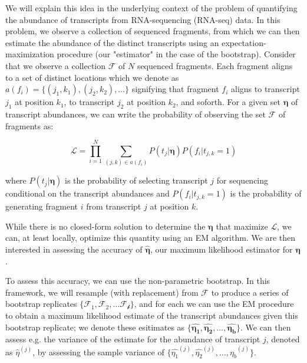 We will explain this idea in the underlying context of the problem of quantifying the abundance 
of transcripts from RNA-sequencing (RNA-seq) data.  In this problem, we observe a collection of 
sequenced fragments, from which we can then estimate the abundance of the distinct transcripts 
using an expectation-maximization procedure (our "estimator" in the case of the bootstrap).  
Consider that we observe a collection $\mathcal{F}$ of $N$ sequenced fragments. Each fragment aligns 
to a set of distinct locations which we denote as $a(f_i) = \{(j_1, k_1), (j_2, k_2), \dots\}$ 
signifying that fragment $f_i$ aligns to transcript $j_1$ at position $k_1$, to transcript $j_2$ 
at position $k_2$, and soforth.  For a given set $\mathbf{\eta}$ of transcript abundances, we can 
write the probability of observing the set $\mathcal{F}$ of fragments as:

$$
\mathcal{L} = \prod_{i=1}^{N} \sum_{(j,k) \in a(f_i)} P(t_j|\mathbf{\eta}) P(f_i|t_{j,k}=1)
$$

where $P(t_j|\mathbf{\eta})$ is the probability of selecting transcript $j$ for sequencing 
conditional on the transcript abundances and $P(f_i|t_{j,k}=1)$ is the probability of generating 
fragment $i$ from transcript $j$ at position $k$.


While there is no closed-form solution to determine the $\mathbf{\eta}$ that maximize $\mathcal{L}$, 
we can, at least locally, optimize this quantity using an EM algorithm.  We are then interested in 
assessing the accuracy of $\mathbf{\hat{\eta}}$, our maximum likelihood estimator for $\mathbf{\eta}$.

To assess this accuracy, we can use the non-parametric bootstrap. In this framework, we will 
resample (with replacement) from $\mathcal{F}$ to produce a series of bootstrap replicates 
$\{\mathcal{F_1}, \mathcal{F_2}, \dots \mathcal{F_b}\}$, and for each we can use the EM procedure 
to obtain a maximum likelihood estimate of the transcript abundances given this bootstrap replicate; 
we denote these esitimates as 
$\{\mathbf{\hat{\eta_1}}, \mathbf{\hat{\eta_2}}, \dots, \mathbf{\hat{\eta_b}}\}$. 
We can then assess e.g. the variance of the estimate for the abundance of transcript $j$, denoted as 
$\hat{\eta}^{(j)}$, by assessing the sample variance of 
$\{ \hat{\eta_1}^{(j)}, \hat{\eta_2}^{(j)}, \dots, \hat{\eta_b}^{(j)} \}$.

